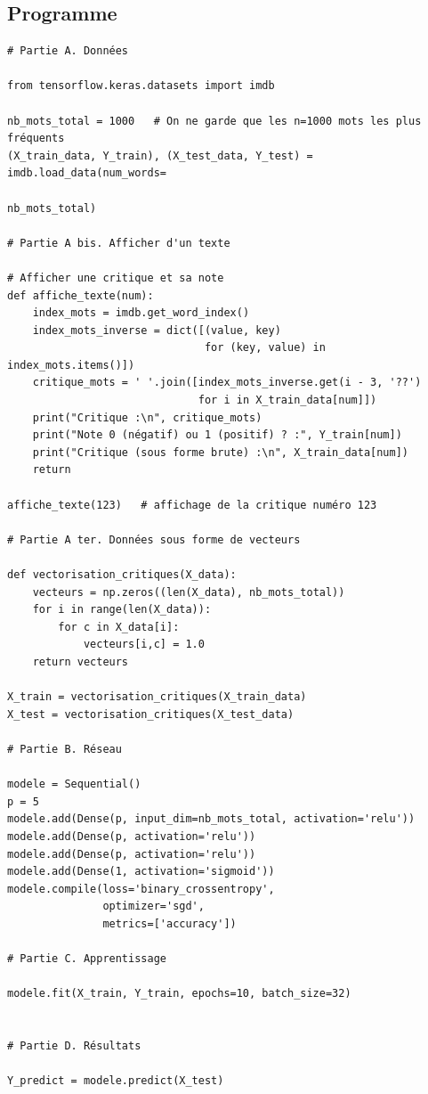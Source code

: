 \documentclass[11pt,class=report,crop=false]{standalone}
\begin{document}
\subsection{Programme}

\begin{lstlisting}
# Partie A. Données

from tensorflow.keras.datasets import imdb

nb_mots_total = 1000   # On ne garde que les n=1000 mots les plus fréquents  
(X_train_data, Y_train), (X_test_data, Y_test) = imdb.load_data(num_words=
                                                                nb_mots_total)

# Partie A bis. Afficher d'un texte

# Afficher une critique et sa note 
def affiche_texte(num):
    index_mots = imdb.get_word_index()
    index_mots_inverse = dict([(value, key)
                               for (key, value) in index_mots.items()])
    critique_mots = ' '.join([index_mots_inverse.get(i - 3, '??')
                              for i in X_train_data[num]])
    print("Critique :\n", critique_mots)
    print("Note 0 (négatif) ou 1 (positif) ? :", Y_train[num])
    print("Critique (sous forme brute) :\n", X_train_data[num])
    return

affiche_texte(123)   # affichage de la critique numéro 123

# Partie A ter. Données sous forme de vecteurs

def vectorisation_critiques(X_data):
    vecteurs = np.zeros((len(X_data), nb_mots_total))
    for i in range(len(X_data)):
        for c in X_data[i]:
            vecteurs[i,c] = 1.0
    return vecteurs

X_train = vectorisation_critiques(X_train_data)
X_test = vectorisation_critiques(X_test_data)

# Partie B. Réseau 

modele = Sequential()
p = 5
modele.add(Dense(p, input_dim=nb_mots_total, activation='relu'))
modele.add(Dense(p, activation='relu'))
modele.add(Dense(p, activation='relu'))
modele.add(Dense(1, activation='sigmoid'))
modele.compile(loss='binary_crossentropy',
               optimizer='sgd',
               metrics=['accuracy'])

# Partie C. Apprentissage

modele.fit(X_train, Y_train, epochs=10, batch_size=32)


# Partie D. Résultats

Y_predict = modele.predict(X_test)
\end{lstlisting}
\end{document}
